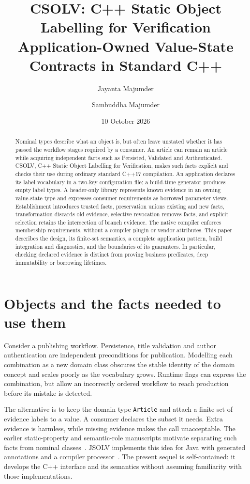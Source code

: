 \documentclass[11pt]{article}
\title{CSOLV: C++ Static Object Labelling for Verification\\
Application-Owned Value-State Contracts in Standard C++}
\author{Jayanta Majumder \and Sambuddha Majumder}
\date{10 October 2026}
\newcommand{\jsolv}{\textsc{JSOLV}}
\begin{document}
\maketitle
\begin{abstract}
Nominal types describe what an object is, but often leave unstated whether it
has passed the workflow stages required by a consumer. An article can remain
an article while acquiring independent facts such as Persisted, Validated and
Authenticated. CSOLV, C++ Static Object Labelling for Verification, makes such
facts explicit and checks their use during ordinary standard C++17 compilation.
An application declares its label vocabulary in a two-key configuration file;
a build-time generator produces empty label types. A header-only library
represents known evidence in an owning value-state type and expresses consumer
requirements as borrowed parameter views. Establishment introduces trusted
facts, preservation unions existing and new facts, transformation discards old
evidence, selective revocation removes facts, and explicit selection retains
the intersection of branch evidence. The native compiler enforces membership
requirements, without a compiler plugin or vendor attributes. This paper
describes the design, its finite-set semantics, a complete application pattern,
build integration and diagnostics, and the boundaries of its guarantees. In
particular, checking declared evidence is distinct from proving business
predicates, deep immutability or borrowing lifetimes.
\end{abstract}

\section{Objects and the facts needed to use them}
Consider a publishing workflow. Persistence, title validation and author
authentication are independent preconditions for publication. Modelling each
combination as a new domain class obscures the stable identity of the domain
concept and scales poorly as the vocabulary grows. Runtime flags can express
the combination, but allow an incorrectly ordered workflow to reach production
before its mistake is detected.

The alternative is to keep the domain type \texttt{Article} and attach a finite
set of evidence labels to a value. A consumer declares the subset it needs.
Extra evidence is harmless, while missing evidence makes the call unacceptable.
The earlier static-property and semantic-role manuscripts motivate separating
such facts from nominal classes~\cite{tags,roles}. \jsolv{} implements this
idea for Java with generated annotations and a compiler processor~\cite{jsolv}.
The present sequel is self-contained: it develops the C++ interface and its
semantics without assuming familiarity with those implementations.
\end{document}

